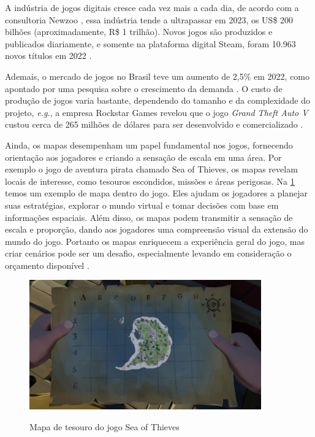 
A indústria de jogos digitais cresce cada vez mais a cada dia, de acordo com a consultoria Newzoo \space\cite{quanto_games_vao_movimentar}, essa indústria tende a ultrapassar em 2023, os US\$ 200 bilhões (aproximadamente, R\$ 1 trilhão). Novos jogos são produzidos e publicados diariamente, e somente na plataforma digital Steam, foram 10.963 novos títulos em 2022\space
\cite{numero_de_jogos_publicados_na_steam}.

Ademais, o mercado de jogos no Brasil teve um aumento de 2,5\% em 2022, como apontado por uma pesquisa sobre o crescimento da demanda \space \cite{pesquisa_games_brasil}. O custo de produção de jogos varia bastante, dependendo do tamanho e da complexidade do projeto, \emph{e.g.}, a empresa Rockstar Games revelou que o jogo \textit{Grand Theft Auto V} custou cerca de 265 milhões de dólares para ser desenvolvido e comercializado \space
\cite{gta_quanto_custou}.

Ainda, os mapas desempenham um papel fundamental nos jogos, fornecendo orientação aos jogadores e criando a sensação de escala em uma área. Por exemplo o jogo de aventura pirata chamado Sea of Thieves, os mapas revelam locais de interesse, como tesouros escondidos, missões e áreas perigosas. Na \cref{fig:treasureMap} temos um exemplo de mapa dentro do jogo. Eles ajudam os jogadores a planejar suas estratégias, explorar o mundo virtual e tomar decisões com base em informações espaciais. Além disso, os mapas podem transmitir a sensação de escala e proporção, dando aos jogadores uma compreensão visual da extensão do mundo do jogo. Portanto os mapas enriquecem a experiência geral do jogo, mas criar cenários pode ser um desafio, especialmente levando em consideração o orçamento disponível \cite{video-game-maps, lecafedugeek}.

\begin{figure}[H]
	\caption{Mapa de tesouro do jogo Sea of Thieves}
	\centering %
	\includegraphics[width=10cm]{figures/Treasure_Map.jpg} %
	\label{fig:treasureMap}
\end{figure}


